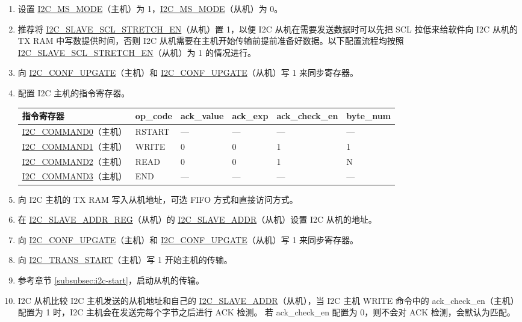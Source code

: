 \documentclass[main\_\_CN.tex]{subfiles}
\begin{document}
\begin{enumerate}
\item 设置 \hyperref[fielddesc:I2CMSMODE]{I2C\_MS\_MODE}（主机）为 1，\hyperref[fielddesc:I2CMSMODE]{I2C\_MS\_MODE}（从机）为 0。
\item 推荐将 \hyperref[fielddesc:I2CSLAVESCLSTRETCHEN]{I2C\_SLAVE\_SCL\_STRETCH\_EN}（从机）置 1，以便 I2C 从机在需要发送数据时可以先把 SCL 拉低来给软件向 I2C 从机的 TX RAM 中写数提供时间，否则 I2C 从机需要在主机开始传输前提前准备好数据。以下配置流程均按照 \hyperref[fielddesc:I2CSLAVESCLSTRETCHEN]{I2C\_SLAVE\_SCL\_STRETCH\_EN}（从机）为 1 的情况进行。
\item 向 \hyperref[fielddesc:I2CCONFUPGATE]{I2C\_CONF\_UPGATE}（主机）和 \hyperref[fielddesc:I2CCONFUPGATE]{I2C\_CONF\_UPGATE}（从机）写 1 来同步寄存器。
\item 配置 I2C 主机的指令寄存器。

\begin{longtable}{ | p{4cm} | p{2cm} | p{2cm} | p{2cm} |p{2cm} | p{2cm} |}
\hline\rowcolor{lightgray}
指令寄存器& op\_code & ack\_value&ack\_exp&ack\_check\_en&byte\_num  \\ \hline
\hyperref[fielddesc:I2CCOMMAND0]{I2C\_COMMAND0}（主机）& RSTART& ---&---&---&---  \\ \hline
\hyperref[fielddesc:I2CCOMMAND1]{I2C\_COMMAND1}（主机）& WRITE& 0&0&1&1  \\ \hline
\hyperref[fielddesc:I2CCOMMAND2]{I2C\_COMMAND2}（主机）& READ& 0&0&1&N  \\ \hline
\hyperref[fielddesc:I2CCOMMAND3]{I2C\_COMMAND3}（主机）& END& ---&---&---&---  \\ \hline
\end{longtable}

\item 向 I2C 主机的 TX RAM 写入从机地址，可选 FIFO 方式和直接访问方式。
\item 在 \hyperref[regdesc:I2CSLAVEADDRREG]{I2C\_SLAVE\_ADDR\_REG}（从机）的 \hyperref[fielddesc:I2CSLAVEADDR]{I2C\_SLAVE\_ADDR}（从机）设置 I2C 从机的地址。
\item 向 \hyperref[fielddesc:I2CCONFUPGATE]{I2C\_CONF\_UPGATE}（主机）和 \hyperref[fielddesc:I2CCONFUPGATE]{I2C\_CONF\_UPGATE}（从机）写 1 来同步寄存器。
\item 向 \hyperref[fielddesc:I2CTRANSSTART]{I2C\_TRANS\_START}（主机）写 1 开始主机的传输。
\item 参考章节 \ref{subsubsec:i2c-start}，启动从机的传输。
\item I2C 从机比较 I2C 主机发送的从机地址和自己的 \hyperref[fielddesc:I2CSLAVEADDR]{I2C\_SLAVE\_ADDR}（从机），当 I2C 主机 WRITE 命令中的 ack\_check\_en（主机）配置为 1 时，I2C 主机会在发送完每个字节之后进行 ACK 检测。 若 ack\_check\_en 配置为 0，则不会对 ACK 检测，会默认为匹配。


\end{enumerate}
\end{document}
